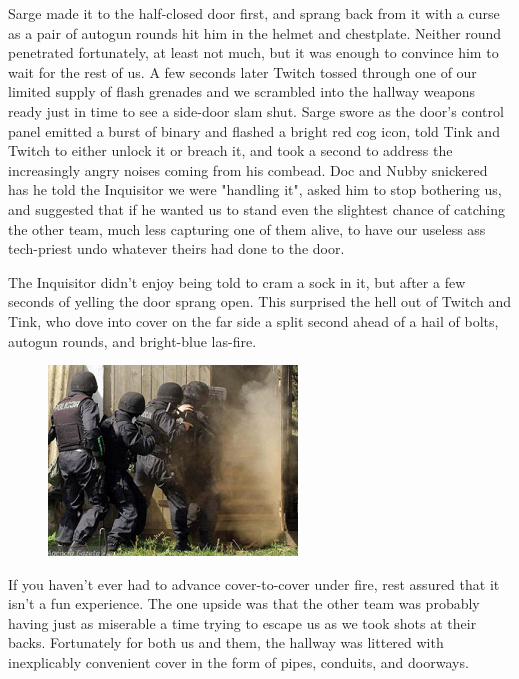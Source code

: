 Sarge made it to the half-closed door first, and sprang back from it with a curse as a pair of autogun rounds hit him in the helmet and chestplate. 
Neither round penetrated fortunately, at least not much, but it was enough to convince him to wait for the rest of us. 
A few seconds later Twitch tossed through one of our limited supply of flash grenades and we scrambled into the hallway weapons ready just in time to see a side-door slam shut. 
Sarge swore as the door's control panel emitted a burst of binary and flashed a bright red cog icon, told Tink and Twitch to either unlock it or breach it, and took a second to address the increasingly angry noises coming from his combead. 
Doc and Nubby snickered has he told the Inquisitor we were "handling it", asked him to stop bothering us, and suggested that if he wanted us to stand even the slightest chance of catching the other team, much less capturing one of them alive, to have our useless ass tech-priest undo whatever theirs had done to the door.

The Inquisitor didn't enjoy being told to cram a sock in it, but after a few seconds of yelling the door sprang open. 
This surprised the hell out of Twitch and Tink, who dove into cover on the far side a split second ahead of a hail of bolts, autogun rounds, and bright-blue las-fire.

\begin{figure}
	\begin{center}
		\includegraphics[width=\figwidth]{pics/18/16.png}
	\end{center}
\end{figure}
If you haven't ever had to advance cover-to-cover under fire, rest assured that it isn't a fun experience. 
The one upside was that the other team was probably having just as miserable a time trying to escape us as we took shots at their backs. 
Fortunately for both us and them, the hallway was littered with inexplicably convenient cover in the form of pipes, conduits, and doorways.

